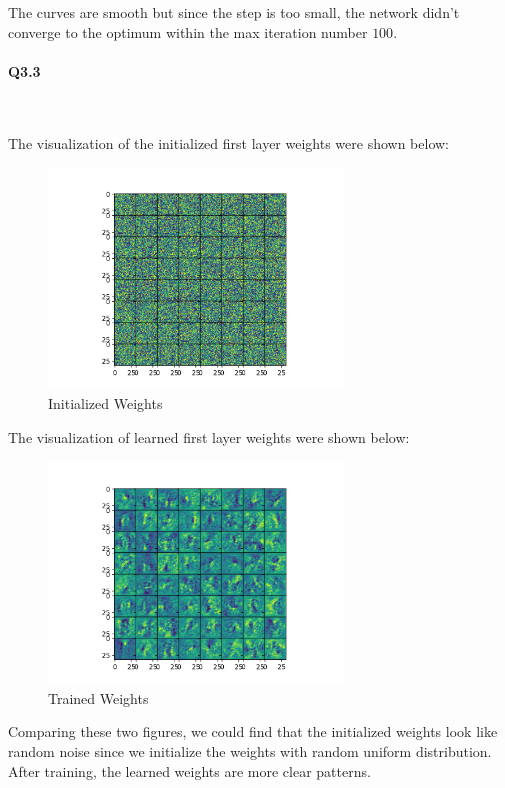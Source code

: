 \documentclass[11pt]{article} \usepackage{fullpage} \usepackage{graphicx} \usepackage{epstopdf} \usepackage{color} \usepackage{psfrag} \usepackage{pdfsync}\usepackage{indentfirst}\usepackage{subfigure}\usepackage{float}\usepackage[section]{placeins}
\begin{document}
The curves are smooth but since the step is too small, the network didn't converge to the optimum within the max iteration number $100$.

\paragraph{Q3.3}~{}

The visualization of the initialized first layer weights were shown below:
\begin{figure}[H]
\centering
\includegraphics[width=0.7\textwidth]{results/q3_3_before.png}
\caption{Initialized Weights}
\end{figure}

The visualization of learned first layer weights were shown below:
\begin{figure}[H]
\centering
\includegraphics[width=0.7\textwidth]{results/q3_3_after.png}
\caption{Trained Weights}
\end{figure}

Comparing these two figures, we could find that the initialized weights look like random noise since we initialize the weights with random uniform distribution. After training, the learned weights are more clear patterns.
\end{document}
